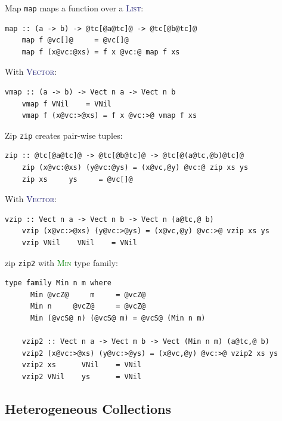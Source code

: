 \documentclass[xcolor={usenames,dvipsnames}]{beamer}
\newcommand{\htycon}[1]{\textcolor{MidnightBlue}{\textsc{#1}}}
\newcommand{\htyfam}[1]{\textcolor{Green}{\textsc{#1}}}
\begin{document}
\begin{frame}[fragile]{Map}
  \texttt{map} maps a function over a \htycon{List}:
  \begin{lstlisting}[style=hask]
    map :: (a -> b) -> @tc[@a@tc]@ -> @tc[@b@tc]@
    map f @vc[]@     = @vc[]@
    map f (x@vc:@xs) = f x @vc:@ map f xs
  \end{lstlisting}

  \pause
  With \htycon{Vector}:
  \begin{lstlisting}[style=hask]
    vmap :: (a -> b) -> Vect n a -> Vect n b
    vmap f VNil    = VNil
    vmap f (x@vc:>@xs) = f x @vc:>@ vmap f xs
  \end{lstlisting}
\end{frame}

\begin{frame}[fragile]{Zip}
  \texttt{zip} creates pair-wise tuples:
  \begin{lstlisting}[style=hask]
    zip :: @tc[@a@tc]@ -> @tc[@b@tc]@ -> @tc[@(a@tc,@b)@tc]@
    zip (x@vc:@xs) (y@vc:@ys) = (x@vc,@y) @vc:@ zip xs ys
    zip xs     ys     = @vc[]@
  \end{lstlisting}

  \pause
  With \htycon{Vector}:
  \begin{lstlisting}[style=hask]
    vzip :: Vect n a -> Vect n b -> Vect n (a@tc,@ b)
    vzip (x@vc:>@xs) (y@vc:>@ys) = (x@vc,@y) @vc:>@ vzip xs ys
    vzip VNil    VNil    = VNil
  \end{lstlisting}
\end{frame}

\begin{frame}[fragile]{zip}
  \texttt{zip2} with \htyfam{Min} type family:
  \begin{lstlisting}[style=hask]
    type family Min n m where
      Min @vcZ@     m     = @vcZ@
      Min n     @vcZ@     = @vcZ@
      Min (@vcS@ n) (@vcS@ m) = @vcS@ (Min n m)

    vzip2 :: Vect n a -> Vect m b -> Vect (Min n m) (a@tc,@ b)
    vzip2 (x@vc:>@xs) (y@vc:>@ys) = (x@vc,@y) @vc:>@ vzip2 xs ys
    vzip2 xs      VNil    = VNil
    vzip2 VNil    ys      = VNil
  \end{lstlisting}
\end{frame}

\subsection{Heterogeneous Collections}
\end{document}
